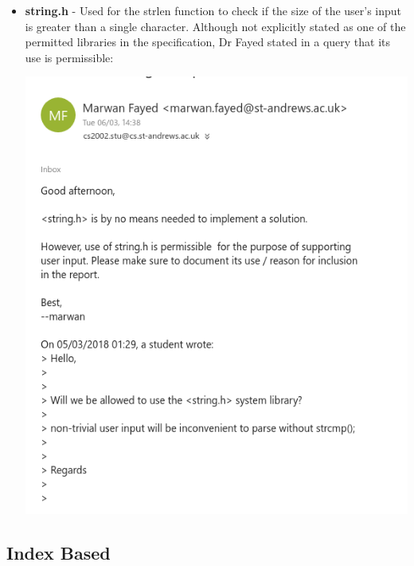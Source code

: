 \documentclass[11]{article}
\begin{document}
\begin{itemize}
					\item \textbf{string.h} - Used for the strlen function to check if the size of the user's input is greater than a single character. Although not explicitly stated as one of the permitted libraries in the specification, Dr Fayed stated in a query that its use is permissible:
					
					\includegraphics[scale=0.4]{Email.png}
				\end{itemize}
		\subsection{Index Based}
\end{document}
